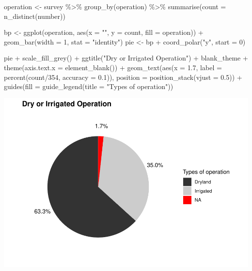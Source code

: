 \documentclass[
]{article}
\newenvironment{Shaded}{\begin{snugshade}}{\end{snugshade}}
\newcommand{\AttributeTok}[1]{\textcolor[rgb]{0.77,0.63,0.00}{#1}}
\newcommand{\DecValTok}[1]{\textcolor[rgb]{0.00,0.00,0.81}{#1}}
\newcommand{\FloatTok}[1]{\textcolor[rgb]{0.00,0.00,0.81}{#1}}
\newcommand{\FunctionTok}[1]{\textcolor[rgb]{0.00,0.00,0.00}{#1}}
\newcommand{\NormalTok}[1]{#1}
\newcommand{\OtherTok}[1]{\textcolor[rgb]{0.56,0.35,0.01}{#1}}
\newcommand{\SpecialCharTok}[1]{\textcolor[rgb]{0.00,0.00,0.00}{#1}}
\newcommand{\StringTok}[1]{\textcolor[rgb]{0.31,0.60,0.02}{#1}}
\begin{document}
\begin{Shaded}
\begin{Highlighting}[]
\NormalTok{operation }\OtherTok{\textless{}{-}}\NormalTok{ survey }\SpecialCharTok{\%\textgreater{}\%}
    \FunctionTok{group\_by}\NormalTok{(operation) }\SpecialCharTok{\%\textgreater{}\%}
    \FunctionTok{summarise}\NormalTok{(}\AttributeTok{count =} \FunctionTok{n\_distinct}\NormalTok{(number))}


\NormalTok{bp }\OtherTok{\textless{}{-}} \FunctionTok{ggplot}\NormalTok{(operation, }\FunctionTok{aes}\NormalTok{(}\AttributeTok{x =} \StringTok{""}\NormalTok{, }\AttributeTok{y =}\NormalTok{ count, }\AttributeTok{fill =}\NormalTok{ operation)) }\SpecialCharTok{+}
    \FunctionTok{geom\_bar}\NormalTok{(}\AttributeTok{width =} \DecValTok{1}\NormalTok{, }\AttributeTok{stat =} \StringTok{"identity"}\NormalTok{)}
\NormalTok{pie }\OtherTok{\textless{}{-}}\NormalTok{ bp }\SpecialCharTok{+} \FunctionTok{coord\_polar}\NormalTok{(}\StringTok{"y"}\NormalTok{, }\AttributeTok{start =} \DecValTok{0}\NormalTok{)}

\NormalTok{pie }\SpecialCharTok{+} \FunctionTok{scale\_fill\_grey}\NormalTok{() }\SpecialCharTok{+} \FunctionTok{ggtitle}\NormalTok{(}\StringTok{"Dry or Irrigated Operation"}\NormalTok{) }\SpecialCharTok{+}
\NormalTok{    blank\_theme }\SpecialCharTok{+} \FunctionTok{theme}\NormalTok{(}\AttributeTok{axis.text.x =} \FunctionTok{element\_blank}\NormalTok{()) }\SpecialCharTok{+} \FunctionTok{geom\_text}\NormalTok{(}\FunctionTok{aes}\NormalTok{(}\AttributeTok{x =} \FloatTok{1.7}\NormalTok{,}
    \AttributeTok{label =} \FunctionTok{percent}\NormalTok{(count}\SpecialCharTok{/}\DecValTok{354}\NormalTok{, }\AttributeTok{accuracy =} \FloatTok{0.1}\NormalTok{)), }\AttributeTok{position =} \FunctionTok{position\_stack}\NormalTok{(}\AttributeTok{vjust =} \FloatTok{0.5}\NormalTok{)) }\SpecialCharTok{+}
    \FunctionTok{guides}\NormalTok{(}\AttributeTok{fill =} \FunctionTok{guide\_legend}\NormalTok{(}\AttributeTok{title =} \StringTok{"Types of operation"}\NormalTok{))}
\end{Highlighting}
\end{Shaded}

\includegraphics{pcca_survey_files/figure-latex/operation-all-1.pdf}
\end{document}
